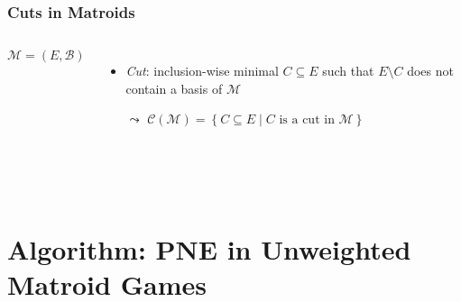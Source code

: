 \documentclass{beamer}
\newcommand{\tupel}[1]{\left(#1\right)}
\newcommand{\set}[1]{\left\{#1\right\}}
\begin{document}
\begin{frame}
  \frametitle{Cuts in Matroids}
  \begin{columns}
    $\mathcal{M} = \tupel{E, \mathcal{B}}$
    \begin{itemize}
      \item \emph{Cut}: inclusion-wise minimal $C\subseteq E$ such that
        $E\setminus C$ does not contain a basis of $\mathcal{M}$
      \item[$\leadsto$] $\mathcal{C}\tupel{\mathcal{M}} =
        \set{C\subseteq E\middle| C\text{ is a cut in } \mathcal{M}}$
    \end{itemize}
    \resizebox{0.8\textwidth}{!}{}
  \end{columns}
  \vspace{0.7cm}
  \begin{columns}
    \\[0.3cm]
  \end{columns}
\end{frame}

\section{Algorithm: PNE in Unweighted Matroid Games}
\end{document}
